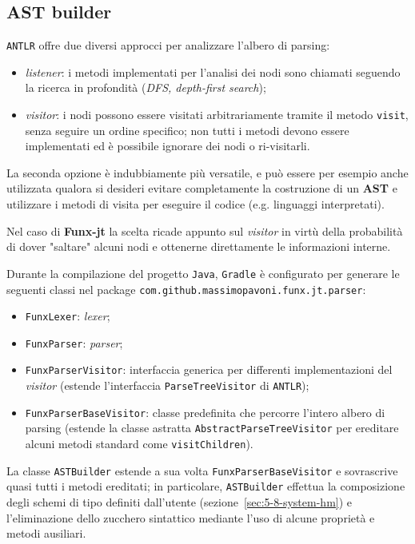 \subsection{AST builder}
\label{sec:5-6-ast-builder}

\texttt{ANTLR} offre due diversi approcci per analizzare l'albero di parsing:
\begin{itemize}
    \item \textit{listener}: i metodi implementati per l'analisi dei nodi sono chiamati seguendo la ricerca
          in profondità (\textit{DFS, depth-first search});
    \item \textit{visitor}: i nodi possono essere visitati arbitrariamente tramite il metodo \texttt{visit},
          senza seguire un ordine specifico; non tutti i metodi devono essere implementati
          ed è possibile ignorare dei nodi o ri-visitarli.
\end{itemize}

\noindent La seconda opzione è indubbiamente più versatile, e può essere per esempio anche utilizzata
qualora si desideri evitare completamente la costruzione di un \textbf{AST} e utilizzare i metodi di visita
per eseguire il codice (e.g. linguaggi interpretati).

\noindent Nel caso di \textbf{Funx-jt} la scelta ricade appunto sul \textit{visitor} in virtù
della probabilità di dover "saltare" alcuni nodi e ottenerne direttamente le informazioni interne.

\noindent Durante la compilazione del progetto \texttt{Java}, \texttt{Gradle} è configurato per generare
le seguenti classi nel package \texttt{com.github.massimopavoni.funx.jt.parser}:
\begin{itemize}
    \item \texttt{FunxLexer}: \textit{lexer};
    \item \texttt{FunxParser}: \textit{parser};
    \item \texttt{FunxParserVisitor}: interfaccia generica per differenti implementazioni del \textit{visitor}
          (estende l'interfaccia \texttt{ParseTreeVisitor} di \texttt{ANTLR});
    \item \texttt{FunxParserBaseVisitor}: classe predefinita che percorre l'intero albero di parsing
          (estende la classe astratta \texttt{AbstractParseTreeVisitor} per ereditare alcuni metodi standard come \texttt{visitChildren}).
\end{itemize}

\noindent La classe \texttt{ASTBuilder} estende a sua volta \texttt{FunxParserBaseVisitor} e sovrascrive quasi tutti i metodi ereditati;
in particolare, \texttt{ASTBuilder} effettua la composizione degli schemi di tipo definiti dall'utente (sezione~\ref{sec:5-8-system-hm})
e l'eliminazione dello zucchero sintattico mediante l'uso di alcune proprietà e metodi ausiliari.



